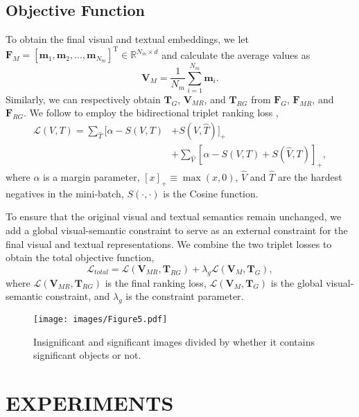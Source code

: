 \documentclass[journal]{IEEEtran}
\begin{document}
\subsection{Objective Function}
To obtain the final visual and textual embeddings, we let $\bm{F}_M = [\bm{m}_1,\bm{m}_2,...,\bm{m}_{N_m}]^{\mathrm{T}} \in \mathbb{R}^{N_m \times d}$ and calculate the average values as
\begin{equation}
\bm{V}_{M}=\frac{1}{N_m} \sum_{i=1}^{N_m} \bm{m}_i.
\end{equation}
Similarly, we can respectively obtain $\bm{T}_G$, $\bm{V}_{M R}$, and $\bm{T}_{R G}$ from $\bm{F}_G$, $\bm{F}_{M R}$, and $\bm{F}_{R G}$. We follow \cite{yuan2022exploring,yuan2022remote} to employ the bidirectional triplet ranking loss \cite{karpathy2015deep},
\begin{equation}\label{eqn21}
\begin{aligned}
\mathcal{L}(V, T)=\sum_{\hat{T}} [\alpha-S(V, T)&+S(V, \hat{T})]_{+} \\
&+\sum_{\hat{V}}[\alpha-S(V, T)+S(\hat{V}, T)]_{+},
\end{aligned}
\end{equation}
where $\alpha$ is a margin parameter, $[x]_{+} \equiv \max (x, 0)$, $\hat{V}$ and $\hat{T}$ are the hardest negatives in the mini-batch, $S\left(\cdot, \cdot \right)$ is the Cosine function.

To ensure that the original visual and textual semantics remain unchanged, we add a global visual-semantic constraint to serve as an external constraint for the final visual and textual representations. We combine the two triplet losses to obtain the total objective function,
\begin{equation}\label{eqn22}
\mathcal{L}_{total} = \mathcal{L}(\bm{V}_{M R}, \bm{T}_{R G}) + \lambda_g \mathcal{L}(\bm{V}_M, \bm{T}_G),
\end{equation}
where $\mathcal{L}(\bm{V}_{M R}, \bm{T}_{R G})$ is the final ranking loss, $\mathcal{L}(\bm{V}_M, \bm{T}_G)$ is the global visual-semantic constraint, and $\lambda_g$ is the constraint parameter.
\begin{figure}[t]
  \centering
  \texttt{[image: images/Figure5.pdf]}
  \caption{Insignificant and significant images divided by whether it contains significant objects or not.}
  \label{fig:fig10}
\end{figure}
\section{EXPERIMENTS}
\end{document}
